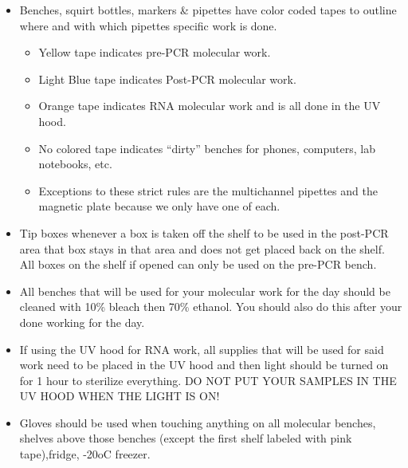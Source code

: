 \documentclass[
  letterpaper,
  DIV=11,
  numbers=noendperiod]{scrreprt}
\begin{document}

\begin{itemize}
\item
  Benches, squirt bottles, markers \& pipettes have color coded tapes to
  outline where and with which pipettes specific work is done.

  \begin{itemize}
  \item
    Yellow tape indicates pre-PCR molecular work.
  \item
    Light Blue tape indicates Post-PCR molecular work.
  \item
    Orange tape indicates RNA molecular work and is all done in the UV
    hood.
  \item
    No colored tape indicates ``dirty'' benches for phones, computers,
    lab notebooks, etc.
  \item
    Exceptions to these strict rules are the multichannel pipettes and
    the magnetic plate because we only have one of each.
  \end{itemize}
\item
  Tip boxes whenever a box is taken off the shelf to be used in the
  post-PCR area that box stays in that area and does not get placed back
  on the shelf. All boxes on the shelf if opened can only be used on the
  pre-PCR bench.
\item
  All benches that will be used for your molecular work for the day
  should be cleaned with 10\% bleach then 70\% ethanol. You should also
  do this after your done working for the day.
\item
  If using the UV hood for RNA work, all supplies that will be used for
  said work need to be placed in the UV hood and then light should be
  turned on for 1 hour to sterilize everything. DO NOT PUT YOUR SAMPLES
  IN THE UV HOOD WHEN THE LIGHT IS ON!
\item
  Gloves should be used when touching anything on all molecular benches,
  shelves above those benches (except the first shelf labeled with pink
  tape),fridge, -20oC freezer.


\end{itemize}
\end{document}

